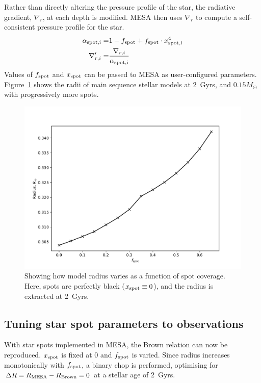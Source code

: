 Rather than directly altering the pressure profile of the star, the radiative gradient, $\nabla_r$, at each depth is modified. MESA then uses $\nabla_r$ to compute a self-consistent pressure profile for the star.
\begin{align}
    \alpha_{\rm spot, i} =& 1 - f_{\rm spot} + f_{\rm spot} \cdot x_{\rm spot, i}^4 \\
    \nabla_{r,i}' =& \frac{\nabla_{r,i}}{\alpha_{\rm spot, i}}
\end{align}
Values of $f_{\rm spot}$ and $x_{\rm spot}$ can be passed to MESA as user-configured parameters. Figure~\ref{fig:modelling:spotted model radii at 2Gyrs} shows the radii of main sequence stellar models at 2~Gyrs, and $0.15 M_\odot$ with progressively more spots.
\begin{figure}
    \centering
    \includegraphics[width=\textwidth]{figures/modelling/spotted_model_radii_at_2gyrs.pdf}
    \caption{Showing how model radius varies as a function of spot coverage. Here, spots are perfectly black ($x_{\rm spot} \equiv 0$), and the radius is extracted at 2~Gyrs.}
    \label{fig:modelling:spotted model radii at 2Gyrs}
\end{figure}


\subsection{Tuning star spot parameters to observations}\label{sect:modelling:tuning star spots to observations}
With star spots implemented in MESA, the Brown relation can now be reproduced.
$x_{\rm spot}$ is fixed at 0 and $f_{\rm spot}$ is varied.
Since radius increases monotonically with $f_{\rm spot}$, a binary chop is performed, optimising for $\Delta R = R_{\rm MESA} - R_{\rm Brown} = 0$ at a stellar age of 2~Gyrs.

